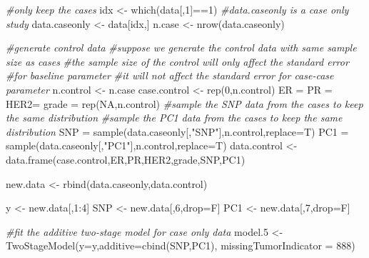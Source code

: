 \documentclass[11pt,]{article}
\newenvironment{Shaded}{\begin{snugshade}}{\end{snugshade}}
\newcommand{\AttributeTok}[1]{\textcolor[rgb]{0.77,0.63,0.00}{#1}}
\newcommand{\CommentTok}[1]{\textcolor[rgb]{0.56,0.35,0.01}{\textit{#1}}}
\newcommand{\ConstantTok}[1]{\textcolor[rgb]{0.00,0.00,0.00}{#1}}
\newcommand{\DecValTok}[1]{\textcolor[rgb]{0.00,0.00,0.81}{#1}}
\newcommand{\FloatTok}[1]{\textcolor[rgb]{0.00,0.00,0.81}{#1}}
\newcommand{\FunctionTok}[1]{\textcolor[rgb]{0.00,0.00,0.00}{#1}}
\newcommand{\NormalTok}[1]{#1}
\newcommand{\OtherTok}[1]{\textcolor[rgb]{0.56,0.35,0.01}{#1}}
\newcommand{\SpecialCharTok}[1]{\textcolor[rgb]{0.00,0.00,0.00}{#1}}
\newcommand{\StringTok}[1]{\textcolor[rgb]{0.31,0.60,0.02}{#1}}
\begin{document}
\begin{Shaded}
\begin{Highlighting}[]
\CommentTok{\#only keep the cases}
\NormalTok{idx }\OtherTok{\textless{}{-}} \FunctionTok{which}\NormalTok{(data[,}\DecValTok{1}\NormalTok{]}\SpecialCharTok{==}\DecValTok{1}\NormalTok{)}
\CommentTok{\#data.caseonly is a case only study}
\NormalTok{data.caseonly }\OtherTok{\textless{}{-}}\NormalTok{ data[idx,]}
\NormalTok{n.case }\OtherTok{\textless{}{-}} \FunctionTok{nrow}\NormalTok{(data.caseonly)}

\CommentTok{\#generate control data}
\CommentTok{\#suppose we generate the control data with same sample size as cases}
\CommentTok{\#the sample size of the control will only affect the standard error}
\CommentTok{\#for baseline parameter}
\CommentTok{\#it will not affect the standard error for case{-}case parameter}
\NormalTok{n.control }\OtherTok{\textless{}{-}}\NormalTok{ n.case}
\NormalTok{case.control }\OtherTok{\textless{}{-}} \FunctionTok{rep}\NormalTok{(}\DecValTok{0}\NormalTok{,n.control)}
\NormalTok{ER }\OtherTok{=}\NormalTok{ PR }\OtherTok{=}\NormalTok{ HER2}\OtherTok{=}\NormalTok{ grade }\OtherTok{=} \FunctionTok{rep}\NormalTok{(}\ConstantTok{NA}\NormalTok{,n.control)}
\CommentTok{\#sample the SNP data from the cases to keep the same distribution}
\CommentTok{\#sample the PC1 data from the cases to keep the same distribution}
\NormalTok{SNP }\OtherTok{=} \FunctionTok{sample}\NormalTok{(data.caseonly[,}\StringTok{"SNP"}\NormalTok{],n.control,}\AttributeTok{replace=}\NormalTok{T)}
\NormalTok{PC1 }\OtherTok{=} \FunctionTok{sample}\NormalTok{(data.caseonly[,}\StringTok{"PC1"}\NormalTok{],n.control,}\AttributeTok{replace=}\NormalTok{T)}
\NormalTok{data.control }\OtherTok{\textless{}{-}} \FunctionTok{data.frame}\NormalTok{(case.control,ER,PR,HER2,grade,SNP,PC1)}

\NormalTok{new.data }\OtherTok{\textless{}{-}} \FunctionTok{rbind}\NormalTok{(data.caseonly,data.control)}

\NormalTok{y }\OtherTok{\textless{}{-}}\NormalTok{ new.data[,}\DecValTok{1}\SpecialCharTok{:}\DecValTok{4}\NormalTok{]}
\NormalTok{SNP }\OtherTok{\textless{}{-}}\NormalTok{ new.data[,}\DecValTok{6}\NormalTok{,drop}\OtherTok{=}\NormalTok{F]}
\NormalTok{PC1 }\OtherTok{\textless{}{-}}\NormalTok{ new.data[,}\DecValTok{7}\NormalTok{,drop}\OtherTok{=}\NormalTok{F]}

\CommentTok{\#fit the additive two{-}stage model for case only data}
\NormalTok{model}\FloatTok{.5} \OtherTok{\textless{}{-}} \FunctionTok{TwoStageModel}\NormalTok{(}\AttributeTok{y=}\NormalTok{y,}\AttributeTok{additive=}\FunctionTok{cbind}\NormalTok{(SNP,PC1),}
                         \AttributeTok{missingTumorIndicator =} \DecValTok{888}\NormalTok{)}
\end{Highlighting}
\end{Shaded}
\end{document}
